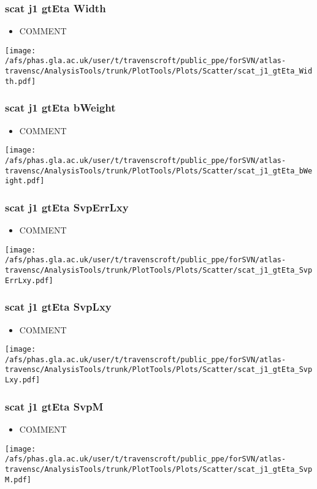 \documentclass{beamer}
\begin{document}
\begin{frame}
\frametitle{scat j1 gtEta Width}
\begin{itemize}
\item COMMENT
\end{itemize}
\begin{center}
\texttt{[image: /afs/phas.gla.ac.uk/user/t/travenscroft/public\_ppe/forSVN/atlas-travensc/AnalysisTools/trunk/PlotTools/Plots/Scatter/scat\_j1\_gtEta\_Width.pdf]}
\end{center}
\end{frame}

\begin{frame}
\frametitle{scat j1 gtEta bWeight}
\begin{itemize}
\item COMMENT
\end{itemize}
\begin{center}
\texttt{[image: /afs/phas.gla.ac.uk/user/t/travenscroft/public\_ppe/forSVN/atlas-travensc/AnalysisTools/trunk/PlotTools/Plots/Scatter/scat\_j1\_gtEta\_bWeight.pdf]}
\end{center}
\end{frame}

\begin{frame}
\frametitle{scat j1 gtEta SvpErrLxy}
\begin{itemize}
\item COMMENT
\end{itemize}
\begin{center}
\texttt{[image: /afs/phas.gla.ac.uk/user/t/travenscroft/public\_ppe/forSVN/atlas-travensc/AnalysisTools/trunk/PlotTools/Plots/Scatter/scat\_j1\_gtEta\_SvpErrLxy.pdf]}
\end{center}
\end{frame}

\begin{frame}
\frametitle{scat j1 gtEta SvpLxy}
\begin{itemize}
\item COMMENT
\end{itemize}
\begin{center}
\texttt{[image: /afs/phas.gla.ac.uk/user/t/travenscroft/public\_ppe/forSVN/atlas-travensc/AnalysisTools/trunk/PlotTools/Plots/Scatter/scat\_j1\_gtEta\_SvpLxy.pdf]}
\end{center}
\end{frame}

\begin{frame}
\frametitle{scat j1 gtEta SvpM}
\begin{itemize}
\item COMMENT
\end{itemize}
\begin{center}
\texttt{[image: /afs/phas.gla.ac.uk/user/t/travenscroft/public\_ppe/forSVN/atlas-travensc/AnalysisTools/trunk/PlotTools/Plots/Scatter/scat\_j1\_gtEta\_SvpM.pdf]}
\end{center}
\end{frame}
\end{document}
